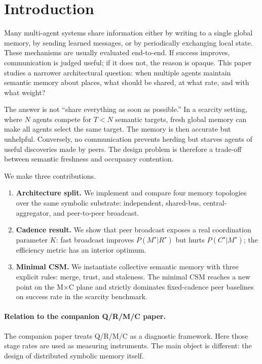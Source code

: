 \documentclass{article}
\begin{document}
\FloatBarrier
\section{Introduction}

Many multi-agent systems share information either by writing to a
single global memory, by sending learned messages, or by periodically
exchanging local state. These mechanisms are usually evaluated
end-to-end. If success improves, communication is judged useful; if it
does not, the reason is opaque. This paper studies a narrower
architectural question: when multiple agents maintain semantic memory
about places, what should be shared, at what rate, and with what
weight?

The answer is not ``share everything as soon as possible.'' In a
scarcity setting, where $N$ agents compete for $T<N$ semantic targets,
fresh global memory can make all agents select the same target. The
memory is then accurate but unhelpful. Conversely, no communication
prevents herding but starves agents of useful discoveries made by
peers. The design problem is therefore a trade-off between semantic
freshness and occupancy contention.

We make three contributions.
\begin{enumerate}[leftmargin=20pt,itemsep=2pt,topsep=2pt]
\item \textbf{Architecture split.} We implement and compare four memory topologies over the same symbolic substrate: independent, shared-bus, central-aggregator, and peer-to-peer broadcast.
\item \textbf{Cadence result.} We show that peer broadcast exposes a real coordination parameter $K$: fast broadcast improves $P(M^\star|R^\star)$ but hurts $P(C^\star|M^\star)$; the efficiency metric has an interior optimum.
\item \textbf{Minimal CSM.} We instantiate collective semantic memory with three explicit rules: merge, trust, and staleness. The minimal CSM reaches a new point on the M$\times$C plane and strictly dominates fixed-cadence peer baselines on success rate in the scarcity benchmark.
\end{enumerate}

\paragraph{Relation to the companion Q/R/M/C paper.}
The companion paper treats Q/R/M/C as a diagnostic framework. Here
those stage rates are used as measuring instruments. The main object
is different: the design of distributed symbolic memory itself.
\end{document}
